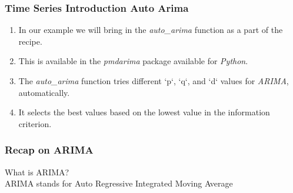 \documentclass[11pt,
aspectratio=169,
hyperref={colorlinks}
]{beamer}
\begin{document}
\begin{frame}[fragile]
        \frametitle{Time Series Introduction Auto Arima}
        \begin{enumerate}
                \item In our example we will bring in the \textit{auto\_arima}  function as a part of the recipe. 
                \item This is available in the \textit{pmdarima} package available for \textit{Python}.
                \item The \textit{auto\_arima} function tries different `p`, `q`, and `d` values for \textit{ARIMA}, automatically. 
                \item It selects the best values based on the lowest value in the information criterion. 
        \end{enumerate}
\end{frame}
\begin{frame}[fragile]
        \frametitle{Recap on ARIMA}
        What is ARIMA?\\
        ARIMA stands for Auto Regressive Integrated Moving Average
\end{frame}
\end{document}
